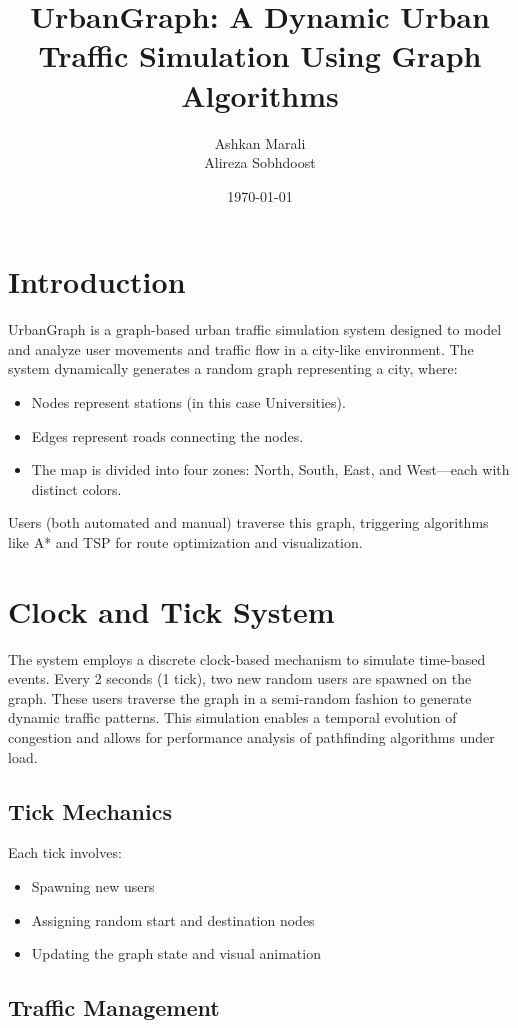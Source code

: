 \documentclass[12pt]{article}
\title{UrbanGraph: A Dynamic Urban Traffic Simulation Using Graph Algorithms}
\author{Ashkan Marali\\Alireza Sobhdoost}
\date{\today}
\begin{document}
\maketitle
\tableofcontents
\newpage

\section{Introduction}
UrbanGraph is a graph-based urban traffic simulation system designed to model and analyze user movements and traffic flow in a city-like environment. The system dynamically generates a random graph representing a city, where:
\begin{itemize}
    \item Nodes represent stations (in this case Universities).
    \item Edges represent roads connecting the nodes.
    \item The map is divided into four zones: North, South, East, and West—each with distinct colors.
\end{itemize}
Users (both automated and manual) traverse this graph, triggering algorithms like A* and TSP for route optimization and visualization.

\section{Clock and Tick System}
The system employs a discrete clock-based mechanism to simulate time-based events. Every 2 seconds (1 tick), two new random users are spawned on the graph. These users traverse the graph in a semi-random fashion to generate dynamic traffic patterns. This simulation enables a temporal evolution of congestion and allows for performance analysis of pathfinding algorithms under load.

\subsection{Tick Mechanics}
Each tick involves:
\begin{itemize}
    \item Spawning new users
    \item Assigning random start and destination nodes
    \item Updating the graph state and visual animation
\end{itemize}

\subsection{Traffic Management}
\end{document}
